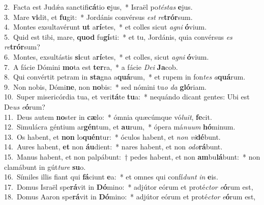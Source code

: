 {2.~}Facta est Judǽa sanctifi\textbf{cá}tio \textbf{e}jus,~* Israël po\textit{té}\textit{stas} \textbf{e}jus.\\
{3.~}Mare \textbf{vi}dit, et \textbf{fu}git:~* Jordánis convérsus \textit{est} \textit{re}\textbf{trór}sum.\\
{4.~}Montes exsultavérunt \textbf{ut} a\textbf{rí}etes,~* et colles sicut \textit{a}\textit{gni} \textbf{ó}vium.\\
{5.~}Quid est tibi, mare, \textbf{quod} fu\textbf{gí}sti:~* et tu, Jordánis, quia convérsus \textit{es} \textit{re}\textbf{trór}sum?\\
{6.~}Montes, exsultástis \textbf{si}cut a\textbf{rí}etes,~* et colles, sicut \textit{a}\textit{gni} \textbf{ó}vium.\\
{7.~}A fácie Dómini \textbf{mo}ta est \textbf{ter}ra,~* a fácie \textit{De}\textit{i} \textbf{Ja}cob.\\
{8.~}Qui convértit petram in \textbf{sta}gna a\textbf{quá}rum,~* et rupem in fon\textit{tes} \textit{a}\textbf{quá}rum.\\
{9.~}Non nobis, Dómi\textbf{ne}, non \textbf{no}bis:~* sed nómini tu\textit{o} \textit{da} \textbf{gló}riam.\\
{10.~}Super misericórdia tua, et veri\textbf{tá}te \textbf{tu}a:~* nequándo dicant gentes: Ubi est De\textit{us} \textit{e}\textbf{ó}rum?\\
{11.~}Deus autem \textbf{no}ster in \textbf{cæ}lo:~* ómnia quæcúmque vó\textit{lu}\textit{it}, \textbf{fe}cit.\\
{12.~}Simulácra géntium ar\textbf{gén}tum, et \textbf{au}rum,~* ópera má\textit{nu}\textit{um} \textbf{hó}minum.\\
{13.~}Os habent, et \textbf{non} lo\textbf{quén}tur:~* óculos habent, et \textit{non} \textit{vi}\textbf{dé}bunt.\\
{14.~}Aures habent, \textbf{et} non \textbf{áu}dient:~* nares habent, et non \textit{o}\textit{do}\textbf{rá}bunt.\\
{15.~}Manus habent, et non palpábunt:~† pedes habent, et non \textbf{am}bu\textbf{lá}bunt:~* non clamábunt in gút\textit{tu}\textit{re} \textbf{su}o.\\
{16.~}Símiles illis fiant qui \textbf{fá}ciunt \textbf{e}a:~* et omnes qui confí\textit{dunt} \textit{in} \textbf{e}is.\\
{17.~}Domus Israël spe\textbf{rá}vit in \textbf{Dó}mino:~* adjútor eórum et proté\textit{ctor} \textit{e}\textbf{ó}rum est,\\
{18.~}Domus Aaron spe\textbf{rá}vit in \textbf{Dó}mino:~* adjútor eórum et proté\textit{ctor} \textit{e}\textbf{ó}rum est,\\
